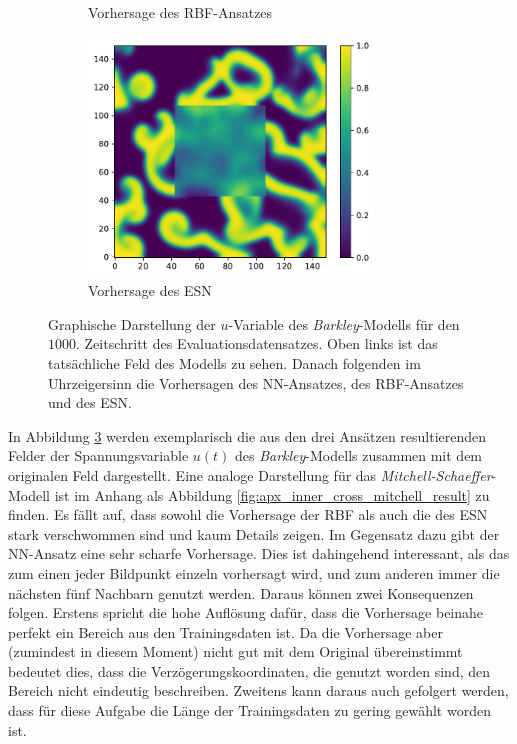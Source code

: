 \begin{figure}[h]
\begin{subfigure}{.5\textwidth}
		\setcapmargin[1cm]{0.5cm}
  		\caption{Vorhersage des \textsc{RBF}-Ansatzes}
  		\label{fig:exp_inner_cross_barkley_result_rbf_pred}
	\end{subfigure}%
	\begin{subfigure}{.5\textwidth}
		\centering
		\includegraphics[height=2.5in]{figures/results/inner_cross_prediction/barkley_u_inner_esn.pdf}
		\setcapmargin[1cm]{0.5cm}
  		\caption{Vorhersage des \textsc{ESN}}
  		\label{fig:exp_inner_cross_barkley_result_esn_pred}
	\end{subfigure}
	\caption{Graphische Darstellung der $u$-Variable des \textit{Barkley}-Modells für den $1000$. Zeitschritt des Evaluationsdatensatzes. Oben links ist das tatsächliche Feld des Modells zu sehen. Danach folgenden im Uhrzeigersinn die Vorhersagen des \textsc{NN}-Ansatzes, des \textsc{RBF}-Ansatzes und des \textsc{ESN}.}
	\label{fig:exp_inner_cross_barkley_result}
\end{figure} 

In Abbildung \ref{fig:exp_inner_cross_barkley_result} werden exemplarisch die aus den drei Ansätzen resultierenden Felder der Spannungsvariable $u(t)$ des \textit{Barkley}-Modells zusammen mit dem originalen Feld dargestellt. Eine analoge Darstellung für das \textit{Mitchell-Schaeffer}-Modell ist im Anhang als Abbildung \ref{fig:apx_inner_cross_mitchell_result} zu finden. Es fällt auf, dass sowohl die Vorhersage der \textsc{RBF} als auch die des \textsc{ESN} stark verschwommen sind und kaum Details zeigen. Im Gegensatz dazu gibt der \textsc{NN}-Ansatz eine sehr scharfe Vorhersage. Dies ist dahingehend interessant, als das zum einen jeder Bildpunkt einzeln vorhersagt wird, und zum anderen immer die nächsten fünf Nachbarn genutzt werden. Daraus können zwei Konsequenzen folgen. Erstens spricht die hohe Auflösung dafür, dass die Vorhersage beinahe perfekt ein Bereich aus den Trainingsdaten ist. Da die Vorhersage aber (zumindest in diesem Moment) nicht gut mit dem Original übereinstimmt bedeutet dies, dass die Verzögerungskoordinaten, die genutzt worden sind, den Bereich nicht eindeutig beschreiben. Zweitens kann daraus auch gefolgert werden, dass für diese Aufgabe die Länge der Trainingsdaten zu gering gewählt worden ist. 
